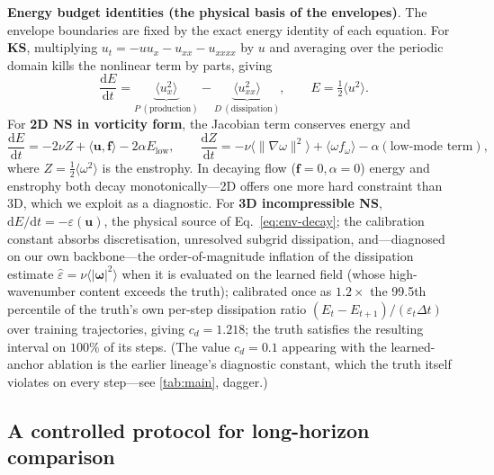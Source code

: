 \documentclass[11pt,a4paper]{article}
\newcommand{\bu}{\bm{u}}
\newcommand{\Ex}{E}
\newcommand{\inner}[2]{\langle #1, #2 \rangle}
\begin{document}
\textbf{Energy budget identities (the physical basis of the envelopes)}. The envelope boundaries are fixed by the exact energy identity of each equation. For \textbf{KS}, multiplying $u_t=-uu_x-u_{xx}-u_{xxxx}$ by $u$ and averaging over the periodic domain kills the nonlinear term by parts, giving
\begin{equation}
\frac{\mathrm{d}\Ex}{\mathrm{d}t}=\underbrace{\langle u_x^2\rangle}_{P\ (\text{production})}-\underbrace{\langle u_{xx}^2\rangle}_{D\ (\text{dissipation})},\qquad \Ex=\tfrac12\langle u^2\rangle .
\label{eq:ks-budget}
\end{equation}
For \textbf{2D NS in vorticity form}, the Jacobian term conserves energy and
\begin{equation}
\frac{\mathrm{d}\Ex}{\mathrm{d}t}=-2\nu Z+\inner{\bu}{\bm f}-2\alpha\Ex_{\mathrm{low}},\qquad
\frac{\mathrm{d}Z}{\mathrm{d}t}=-\nu\langle\|\nabla\omega\|^2\rangle+\langle\omega f_\omega\rangle-\alpha(\text{low-mode term}),
\label{eq:ns2d-budget}
\end{equation}
where $Z=\tfrac12\langle\omega^2\rangle$ is the enstrophy. In decaying flow ($\bm f{=}0,\alpha{=}0$) energy and enstrophy both decay monotonically---2D offers one more hard constraint than 3D, which we exploit as a diagnostic. For \textbf{3D incompressible NS}, $\mathrm{d}\Ex/\mathrm{d}t=-\varepsilon(\bu)$, the physical source of Eq.~\eqref{eq:env-decay}; the calibration constant absorbs discretisation, unresolved subgrid dissipation, and---diagnosed on our own backbone---the order-of-magnitude inflation of the dissipation estimate $\hat\varepsilon=\nu\langle|\bm\omega|^2\rangle$ when it is evaluated on the learned field (whose high-wavenumber content exceeds the truth); calibrated once as $1.2\times$ the 99.5th percentile of the truth's own per-step dissipation ratio $(\Ex_t-\Ex_{t+1})/(\varepsilon_t\Delta t)$ over training trajectories, giving $c_d{=}1.218$; the truth satisfies the resulting interval on $100\%$ of its steps. (The value $c_d{=}0.1$ appearing with the learned-anchor ablation is the earlier lineage's diagnostic constant, which the truth itself violates on every step---see \ref{tab:main}, dagger.)

\subsection{A controlled protocol for long-horizon comparison}\label{sec:setup}
\end{document}
